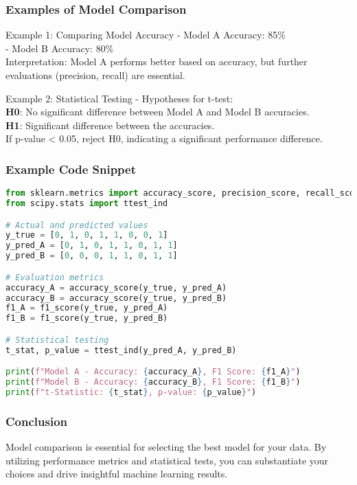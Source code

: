 \documentclass[aspectratio=169]{beamer}
\begin{document}
\begin{frame}[fragile]
    \frametitle{Examples of Model Comparison}
    \begin{block}{Example 1: Comparing Model Accuracy}
        - Model A Accuracy: 85\% \\
        - Model B Accuracy: 80\% \\
        Interpretation: Model A performs better based on accuracy, but further evaluations (precision, recall) are essential.
    \end{block}
    \begin{block}{Example 2: Statistical Testing}
        - Hypotheses for t-test: \\
        \textbf{H0}: No significant difference between Model A and Model B accuracies. \\
        \textbf{H1}: Significant difference between the accuracies. \\
        If p-value < 0.05, reject H0, indicating a significant performance difference.
    \end{block}
\end{frame}

\begin{frame}[fragile]
    \frametitle{Example Code Snippet}
    \begin{lstlisting}[language=Python]
from sklearn.metrics import accuracy_score, precision_score, recall_score, f1_score
from scipy.stats import ttest_ind

# Actual and predicted values
y_true = [0, 1, 0, 1, 1, 0, 0, 1]
y_pred_A = [0, 1, 0, 1, 1, 0, 1, 1]  
y_pred_B = [0, 0, 0, 1, 1, 0, 1, 1]  

# Evaluation metrics
accuracy_A = accuracy_score(y_true, y_pred_A)
accuracy_B = accuracy_score(y_true, y_pred_B)
f1_A = f1_score(y_true, y_pred_A)
f1_B = f1_score(y_true, y_pred_B)

# Statistical testing
t_stat, p_value = ttest_ind(y_pred_A, y_pred_B)

print(f"Model A - Accuracy: {accuracy_A}, F1 Score: {f1_A}")
print(f"Model B - Accuracy: {accuracy_B}, F1 Score: {f1_B}")
print(f"t-Statistic: {t_stat}, p-value: {p_value}")
    \end{lstlisting}
\end{frame}

\begin{frame}
    \frametitle{Conclusion}
    \begin{block}{}
        Model comparison is essential for selecting the best model for your data. By utilizing performance metrics and statistical tests, you can substantiate your choices and drive insightful machine learning results.
    \end{block}
\end{frame}
\end{document}
